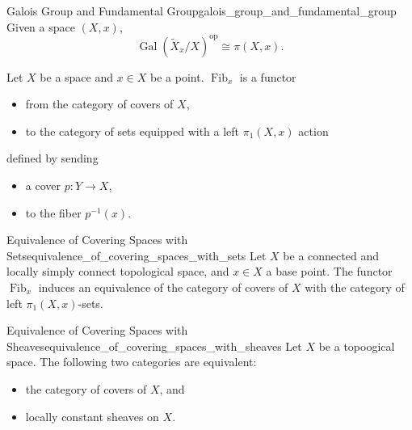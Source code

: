 \documentclass{article}
\begin{document}
\begin{theorem}{Galois Group and Fundamental Group}{galois_group_and_fundamental_group}
    Given a space $(X,x)$,
    \[ \operatorname{Gal}(\tilde{X}_x/X)^\mathrm{op} \cong \pi(X,x). \]
\end{theorem}

Let $X$ be a space and $x\in X$ be a point.
$\operatorname{Fib}_x$ is a functor
\begin{itemize}
    \item from the category of covers of $X$,
    \item to the category of sets equipped with a left $\pi_1(X,x)$ action
\end{itemize}
defined by sending
\begin{itemize}
    \item a cover $p:Y\rightarrow X$,
    \item to the fiber $p^{-1}(x)$.
\end{itemize}

\begin{theorem}{Equivalence of Covering Spaces with Sets}{equivalence_of_covering_spaces_with_sets}
    Let $X$ be a connected and locally simply connect topological space, and $x\in X$ a base point.
    The functor $\operatorname{Fib}_x$ induces an equivalence of the category of covers of $X$ with the category of left $\pi_1(X,x)$-sets.
\end{theorem}

\begin{theorem}{Equivalence of Covering Spaces with Sheaves}{equivalence_of_covering_spaces_with_sheaves}
    Let $X$ be a topoogical space.
    The following two categories are equivalent:
    \begin{itemize}
        \item the category of covers of $X$, and
        \item locally constant sheaves on $X$.
    \end{itemize}
\end{theorem}
\end{document}
